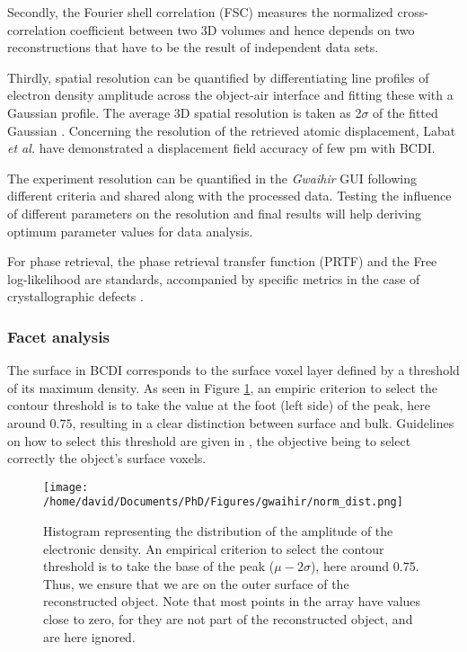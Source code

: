 Secondly, the Fourier shell correlation (FSC) \parencite{van_heel_fourier_2005} measures the normalized cross-correlation coefficient between two 3D volumes and hence depends on two reconstructions that have to be the result of independent data sets.

Thirdly, spatial resolution can be quantified by differentiating line profiles of electron density amplitude across the object-air interface and fitting these with a Gaussian profile.
The average 3D spatial resolution is taken as 2$\sigma$ of the fitted Gaussian \parencite{hofmann_nanoscale_2020}. Concerning the resolution of the retrieved atomic displacement, Labat \textit{et al.} \cite{labat_inversion_2015} have demonstrated a displacement field accuracy of few pm with BCDI.

The experiment resolution can be quantified in the \textit{Gwaihir} GUI following different criteria and shared along with the processed data. Testing the influence of different parameters on the resolution and final results will help deriving optimum parameter values for data analysis.

For phase retrieval, the phase retrieval transfer function (PRTF) \parencite{chapman_high-resolution_2006,cherukara_anisotropic_2018} and the Free log-likelihood \parencite{pynx2020FLLK} are standards, accompanied by specific metrics in the case of crystallographic defects \parencite{Ulvestad2017}.

\subsubsection{Facet analysis}

The surface in BCDI corresponds to the surface voxel layer defined by a threshold of its maximum density.
As seen in Figure \ref{fig:histo}, an empiric criterion to select the contour threshold is to take the value at the foot (left side) of the peak, here around $0.75$, resulting in a clear distinction between surface and bulk.
Guidelines on how to select this threshold are given in \cite{Carnis2019_scientific_reports}, the objective being to select correctly the object's surface voxels.

\begin{figure}[!htb]
   \centering
   \texttt{[image: /home/david/Documents/PhD/Figures/gwaihir/norm\_dist.png]}
   \caption{Histogram representing the distribution of the amplitude of the electronic density.
   An empirical criterion to select the contour threshold is to take the base of the peak ($\mu - 2\sigma$), here around 0.75.
   Thus, we ensure that we are on the outer surface of the reconstructed object.
   Note that most points in the array have values close to zero, for they are not part of the reconstructed object, and are here ignored.
   }
   \label{fig:histo}
\end{figure}

